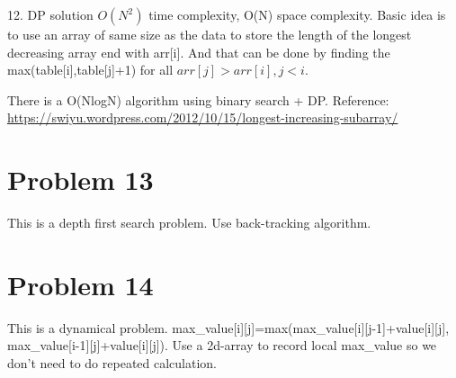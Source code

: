 \documentclass[12pt]{amsart}
\begin{document}
12.	DP solution $O(N^2)$ time complexity, O(N) space complexity. 
Basic idea is to use an array of same size as the data to store the length of the longest decreasing array end with arr[i]. And that can be done by finding the max(table[i],table[j]+1) for all $arr[j]>arr[i],j<i$.

\begin{framed}

\end{framed}

There is a O(NlogN) algorithm using binary search + DP.
Reference: \url{https://swiyu.wordpress.com/2012/10/15/longest-increasing-subarray/}


\section{Problem 13}

This is a depth first search problem. Use back-tracking algorithm.


\begin{framed}

\end{framed}



\section{Problem 14}

This is a dynamical problem. max\_value[i][j]=max(max\_value[i][j-1]+value[i][j], max\_value[i-1][j]+value[i][j]). Use a 2d-array to record local max\_value so we don't need to do repeated calculation.



\begin{framed}

\end{framed}



%
\end{document}
